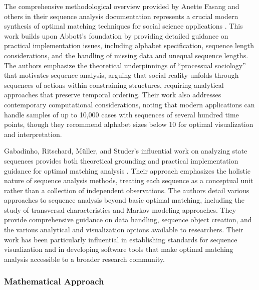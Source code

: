 \documentclass[../main.tex]{subfiles}
\begin{document}
The comprehensive methodological overview provided by Anette Fasang and others in their sequence analysis documentation represents a crucial modern synthesis of optimal matching techniques for social science applications \parencite{sequence_analysis_social_science}. This work builds upon Abbott's foundation by providing detailed guidance on practical implementation issues, including alphabet specification, sequence length considerations, and the handling of missing data and unequal sequence lengths. The authors emphasize the theoretical underpinnings of ``processual sociology'' that motivates sequence analysis, arguing that social reality unfolds through sequences of actions within constraining structures, requiring analytical approaches that preserve temporal ordering. Their work also addresses contemporary computational considerations, noting that modern applications can handle samples of up to 10,000 cases with sequences of several hundred time points, though they recommend alphabet sizes below 10 for optimal visualization and interpretation.

Gabadinho, Ritschard, Müller, and Studer's influential work on analyzing state sequences provides both theoretical grounding and practical implementation guidance for optimal matching analysis \parencite{traminer_documentation}. Their approach emphasizes the holistic nature of sequence analysis methods, treating each sequence as a conceptual unit rather than a collection of independent observations. The authors detail various approaches to sequence analysis beyond basic optimal matching, including the study of transversal characteristics and Markov modeling approaches. They provide comprehensive guidance on data handling, sequence object creation, and the various analytical and visualization options available to researchers. Their work has been particularly influential in establishing standards for sequence visualization and in developing software tools that make optimal matching analysis accessible to a broader research community.

\subsubsection{Mathematical Approach}
\end{document}
